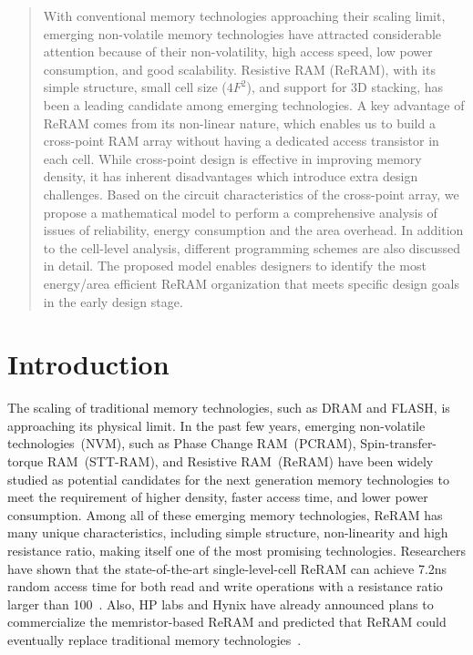 \begin{abstract}
With conventional memory technologies approaching their scaling limit,
emerging non-volatile memory technologies have attracted considerable
attention because of their non-volatility, high access speed, low power
consumption, and good scalability. Resistive RAM (ReRAM), with its simple
structure, small cell size ($4F^2$), and support for 3D stacking, has been
a leading candidate among emerging technologies. A key advantage of ReRAM
comes from its non-linear nature, which enables us to build a cross-point
RAM array without having a dedicated access transistor in each cell. While
cross-point design is effective in improving memory density, it has
inherent disadvantages which introduce extra design challenges. Based on
the circuit characteristics of the cross-point array, we propose a
mathematical model to perform a comprehensive analysis of issues of
reliability, energy consumption and the area overhead. In addition to the
cell-level analysis, different programming schemes are also discussed in
detail. The proposed model enables designers to identify the most
energy/area efficient ReRAM organization that meets specific design goals
in the early design stage.

\end{abstract}

\section{Introduction}\label{sec:intro}
The scaling of traditional memory technologies, such as DRAM and FLASH, is
approaching its physical limit. In the past few years, emerging
non-volatile technologies~(NVM), such as Phase Change RAM~(PCRAM),
Spin-transfer-torque RAM~(STT-RAM), and Resistive RAM~(ReRAM) have been widely
studied as potential candidates for the next generation memory
technologies to meet the requirement of higher density, faster access time, and
lower power consumption. Among all of these emerging memory technologies,
ReRAM has many unique characteristics, including simple structure,
non-linearity and high resistance ratio, making itself one of the most
promising technologies. Researchers have shown that the state-of-the-art
single-level-cell ReRAM can achieve 7.2ns random access time for both
read and write operations with a resistance ratio larger than
100~\cite{ReRAM_ISSCC2011_Sheu}. Also, HP labs and Hynix have already
announced plans to commercialize the memristor-based ReRAM and predicted
that ReRAM could eventually replace traditional memory
technologies~\cite{memristor:HpHynix}.

